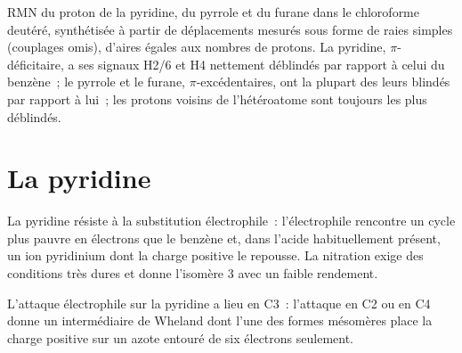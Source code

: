 \begin{omfigure}

{\small RMN du proton de la pyridine, du pyrrole et du furane dans le
chloroforme deutéré, synthétisée à partir de déplacements mesurés sous
forme de raies simples (couplages omis), d'aires égales aux nombres de
protons. La pyridine, $\pi$-déficitaire, a ses signaux H2/6 et H4
nettement déblindés par rapport à celui du benzène~; le pyrrole et le
furane, $\pi$-excédentaires, ont la plupart des leurs blindés par rapport à
lui~; les protons voisins de l'hétéroatome sont toujours les plus
déblindés.}
\end{omfigure}

\section{La pyridine}

La pyridine résiste à la substitution électrophile~: l'électrophile
rencontre un cycle plus pauvre en électrons que le benzène et, dans l'acide
habituellement présent, un ion pyridinium dont la charge positive le
repousse. La nitration exige des conditions très dures et donne
l'isomère 3 avec un faible rendement.

\begin{proposition}\label{prop:b3:heterocycles:pyridine-c3}
L'attaque électrophile sur la pyridine a lieu en C3~: l'attaque en C2 ou en
C4 donne un intermédiaire de Wheland dont l'une des formes mésomères place
la charge positive sur un azote entouré de six électrons seulement.
\end{proposition}

